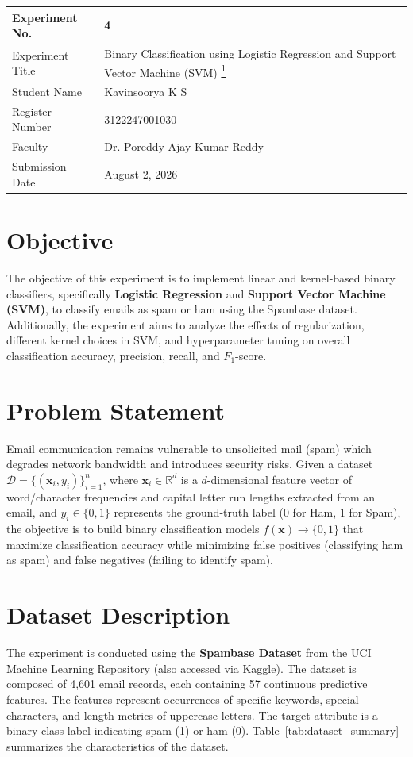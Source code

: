 \documentclass[12pt,a4paper]{article}
\begin{document}
\begin{tabular}{|p{4cm}|p{11cm}|}
\hline
Experiment No. & 4 \\ \hline
Experiment Title & Binary Classification using Logistic Regression and Support Vector Machine (SVM) \href{https://github.com/Kavin-ks/Machine-Learning-Projects}{\textsuperscript{1}}\\ \hline
Student Name & Kavinsoorya K S \\ \hline
Register Number & 3122247001030 \\ \hline
Faculty & Dr. Poreddy Ajay Kumar Reddy \\ \hline
Submission Date & August 2, 2026 \\ \hline
\end{tabular}

\vspace{0.5cm}

\section{Objective}
The objective of this experiment is to implement linear and kernel-based binary classifiers, specifically \textbf{Logistic Regression} and \textbf{Support Vector Machine (SVM)}, to classify emails as spam or ham using the Spambase dataset. Additionally, the experiment aims to analyze the effects of regularization, different kernel choices in SVM, and hyperparameter tuning on overall classification accuracy, precision, recall, and $F_1$-score.

\section{Problem Statement}
Email communication remains vulnerable to unsolicited mail (spam) which degrades network bandwidth and introduces security risks. Given a dataset $\mathcal{D} = \{(\mathbf{x}_i, y_i)\}_{i=1}^n$, where $\mathbf{x}_i \in \mathbb{R}^d$ is a $d$-dimensional feature vector of word/character frequencies and capital letter run lengths extracted from an email, and $y_i \in \{0, 1\}$ represents the ground-truth label ($0$ for Ham, $1$ for Spam), the objective is to build binary classification models $f(\mathbf{x}) \to \{0, 1\}$ that maximize classification accuracy while minimizing false positives (classifying ham as spam) and false negatives (failing to identify spam). 

\section{Dataset Description}
The experiment is conducted using the \textbf{Spambase Dataset} from the UCI Machine Learning Repository (also accessed via Kaggle). The dataset is composed of 4,601 email records, each containing 57 continuous predictive features. The features represent occurrences of specific keywords, special characters, and length metrics of uppercase letters. The target attribute is a binary class label indicating spam (1) or ham (0). Table~\ref{tab:dataset_summary} summarizes the characteristics of the dataset.
\end{document}
